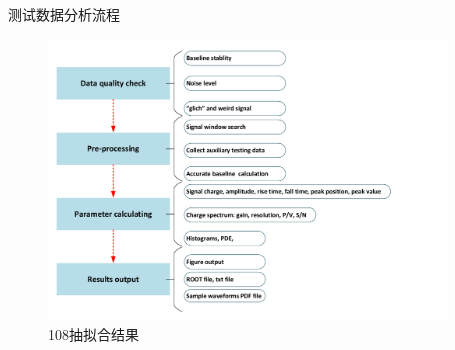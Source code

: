 \documentclass[11pt,compress,xcolor=x11names,UTF8]{beamer}
\begin{document}
\begin{frame}{测试数据分析流程}
\vspace{-.5cm}
\begin{figure}
\centering
\includegraphics[width=0.94\textwidth]{figures/program.pdf} %
\caption{108抽拟合结果}
\end{figure}

\end{frame}
%
%
\end{document}

